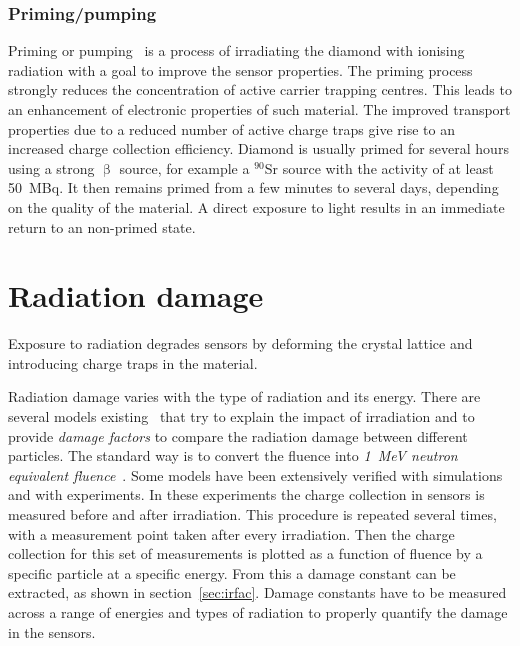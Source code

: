 \subsubsection{Priming/pumping}
Priming or pumping~\cite{pumping:00000} is a process of irradiating the diamond with ionising radiation with a goal to improve the sensor properties. The priming process strongly reduces the concentration of active carrier trapping centres. This leads to an enhancement of electronic properties of such material. The improved transport properties due to a reduced number of active charge traps give rise to an increased charge collection efficiency. Diamond is usually primed for several hours using a strong $\upbeta$ source, for example a $^{90}$Sr source with the activity of at least 50~MBq. It then remains primed from a few minutes to several days, depending on the quality of the material. A direct exposure to light results in an immediate return to an non-primed state.



\section{Radiation damage}
\label{sec:raddam}
Exposure to radiation degrades sensors by deforming the crystal lattice and introducing charge traps in the material. 

Radiation damage varies with the type of radiation and its energy. There are several models existing~\cite{2002NIMPA,Guthoff:2014223} that try to explain the impact of irradiation and to provide \emph{damage factors} to compare the radiation damage between different particles. The standard way is to convert the fluence into \emph{1~MeV neutron equivalent fluence}~\cite{NEQ:00000}. Some models have been extensively verified with simulations and with experiments. In these experiments the charge collection in sensors is measured before and after irradiation. This procedure is repeated several times, with a measurement point taken after every irradiation. Then the charge collection for this set of measurements is plotted as a function of fluence by a specific particle at a specific energy. From this a damage constant can be extracted, as shown in section~\ref{sec:irfac}. Damage constants have to be measured across a range of energies and types of radiation to properly quantify the damage in the sensors. %

